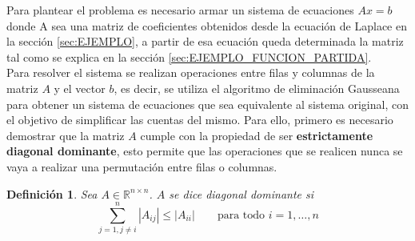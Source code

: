 \documentclass[12pt]{article}
\newtheorem{defi}{Definición}
\begin{document}
Para plantear el problema es necesario armar un sistema de ecuaciones $Ax =b$ donde A sea una matriz de coeficientes obtenidos desde la ecuación de Laplace en la sección \ref{sec:EJEMPLO}, a partir de esa ecuación queda determinada la matriz tal como se explica en la sección \ref{sec:EJEMPLO_FUNCION_PARTIDA}. \\
Para resolver el sistema se realizan operaciones entre filas y columnas de la matriz $A$ y el vector $b$, es decir, se utiliza el algoritmo de eliminación 
Gausseana para obtener un sistema de ecuaciones que sea equivalente al sistema original, con el objetivo de simplificar las cuentas del mismo. Para ello, primero es necesario demostrar que la matriz $A$ cumple con la propiedad de ser \textbf{estrictamente diagonal dominante}, esto permite que las operaciones que se realicen nunca se vaya a realizar una permutación entre filas o columnas. 


\begin{defi}
	Sea ${A} \in \mathbb{R}^{n \times n}$. ${A}$ se dice \emph{diagonal dominante} si 
	\[
	\sum_{j = 1, j \neq i }^{n}|A_{ij}| \leq  |A_{ii}| \qquad \text{para todo $i = 1, \dots, n$}
	\]
	
\end{defi}
\end{document}
